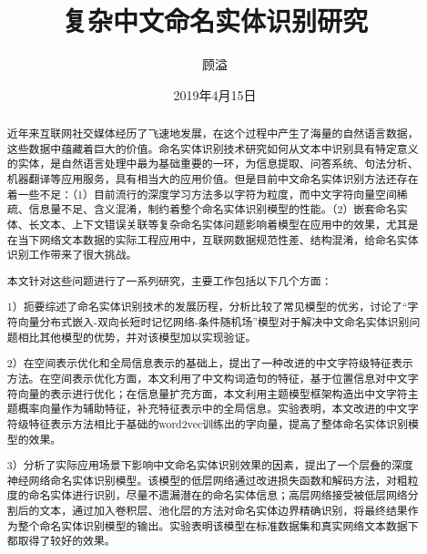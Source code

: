 \documentclass[winfonts,master,oneside,nobackinfo]{njuthesis}
\title{复杂中文命名实体识别研究}
\author{顾溢}
\institute{南京大学}
\date{2019年4月15日}
\begin{document}

\maketitle
\makeenglishtitle



\begin{abstract}

近年来互联网社交媒体经历了飞速地发展，在这个过程中产生了海量的自然语言数据，这些数据中蕴藏着巨大的价值。命名实体识别技术研究如何从文本中识别具有特定意义的实体，是自然语言处理中最为基础重要的一环，为信息提取、问答系统、句法分析、机器翻译等应用服务，具有相当大的应用价值。但是目前中文命名实体识别方法还存在着一些不足：（1）目前流行的深度学习方法多以字符为粒度，而中文字符向量空间稀疏、信息量不足、含义混淆，制约着整个命名实体识别模型的性能。（2）嵌套命名实体、长文本、上下文错误关联等复杂命名实体问题影响着模型在应用中的效果，尤其是在当下网络文本数据的实际工程应用中，互联网数据规范性差、结构混淆，给命名实体识别工作带来了很大挑战。

本文针对这些问题进行了一系列研究，主要工作包括以下几个方面：

1）扼要综述了命名实体识别技术的发展历程，分析比较了常见模型的优劣，讨论了“字符向量分布式嵌入-双向长短时记忆网络-条件随机场”模型对于解决中文命名实体识别问题相比其他模型的优势，并对该模型加以实现验证。

2）在空间表示优化和全局信息表示的基础上，提出了一种改进的中文字符级特征表示方法。在空间表示优化方面，本文利用了中文构词造句的特征，基于位置信息对中文字符向量的表示进行优化；在信息量扩充方面，本文利用主题模型框架构造出中文字符主题概率向量作为辅助特征，补充特征表示中的全局信息。实验表明，本文改进的中文字符级特征表示方法相比于基础的word2vec训练出的字向量，提高了整体命名实体识别模型的效果。

3）分析了实际应用场景下影响中文命名实体识别效果的因素，提出了一个层叠的深度神经网络命名实体识别模型。该模型的低层网络通过改进损失函数和解码方法，对粗粒度的命名实体进行识别，尽量不遗漏潜在的命名实体信息；高层网络接受被低层网络分割后的文本，通过加入卷积层、池化层的方法对命名实体边界精确识别，将最终结果作为整个命名实体识别模型的输出。实验表明该模型在标准数据集和真实网络文本数据下都取得了较好的效果。


\end{abstract}
\end{document}
